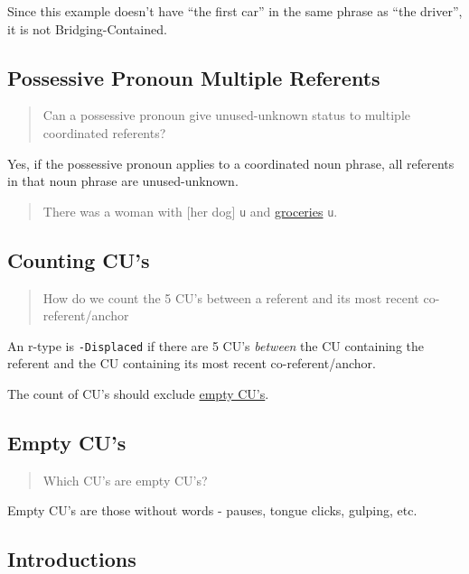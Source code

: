 \documentclass[
]{book}
\begin{document}
Since this example doesn't have ``the first car'' in the same phrase as ``the driver'', it is not Bridging-Contained.

\hypertarget{possessive-pronoun-multiple-referents}{%
\subsection{Possessive Pronoun Multiple Referents}\label{possessive-pronoun-multiple-referents}}

\begin{quote}
Can a possessive pronoun give unused-unknown status to multiple coordinated referents?
\end{quote}

Yes, if the possessive pronoun applies to a coordinated noun phrase, all referents in that noun phrase are unused-unknown.

\begin{quote}
There was a woman with {[}her dog{]} \texttt{u} and \protect\hyperlink{groceries-1}{groceries} \texttt{u}.
\end{quote}

\hypertarget{counting-cus}{%
\subsection{Counting CU's}\label{counting-cus}}

\begin{quote}
How do we count the 5 CU's between a referent and its most recent co-referent/anchor
\end{quote}

An r-type is \texttt{-Displaced} if there are 5 CU's \emph{between} the CU containing the referent and the CU containing its most recent co-referent/anchor.

The count of CU's should exclude \href{empty-cu's}{empty CU's}.

\hypertarget{empty-cus}{%
\subsection{Empty CU's}\label{empty-cus}}

\begin{quote}
Which CU's are empty CU's?
\end{quote}

Empty CU's are those without words - pauses, tongue clicks, gulping, etc.

\hypertarget{introductions}{%
\subsection{Introductions}\label{introductions}}
\end{document}
